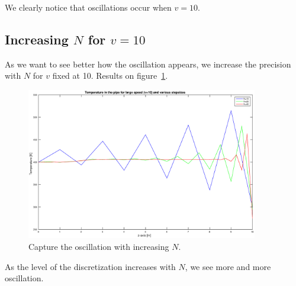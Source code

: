 \documentclass[11pt,a4paper]{report}
\begin{document}
We clearly notice that oscillations occur when $v=10$.

\subsection{Increasing $N$ for $v=10$}

As we want to see better how the oscillation appears, we increase the precision with $N$ for $v$ fixed at 10. Results on figure~\ref{fig:3}.

\begin{figure}[!h]
\centering
\includegraphics[width = 0.9\textwidth]{./fig3.eps}
\caption{Capture the oscillation with increasing $N$.}
\label{fig:3}
\end{figure}

As the level of the discretization increases with $N$, we see more and more oscillation.
\end{document}
